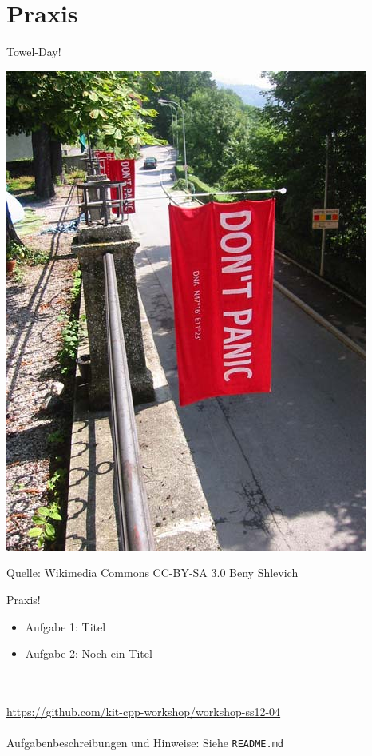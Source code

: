\section{Praxis}

\begin{frame}{Towel-Day!}
	\begin{center}
		\includegraphics[height=0.8\textheight]{images/Towelday-Innsbruck.jpg}
	\end{center}
	
	\scriptsize
	\raisebox{4em}
	{
		Quelle: Wikimedia Commons
		CC-BY-SA 3.0 Beny Shlevich
	}
\end{frame}

\begin{frame}[fragile]{Praxis!}
	\begin{itemize}
		\item Aufgabe 1: Titel
		\item Aufgabe 2: Noch ein Titel
	\end{itemize}
	\ \\
	\ \\
	\large{\url{https://github.com/kit-cpp-workshop/workshop-ss12-04}} \\
	\ \\
	Aufgabenbeschreibungen und Hinweise: Siehe \verb|README.md|

\end{frame}
